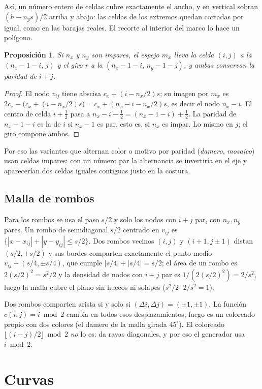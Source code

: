 \documentclass[11pt,a4paper]{article}
\theoremstyle{definition}
\theoremstyle{plain}
\newtheorem{proposicion}{Proposición}[section]
\theoremstyle{remark}
\begin{document}
Así, un número entero de celdas cubre exactamente el ancho, y en vertical sobran
$(h-n_ys)/2$ arriba y abajo: las celdas de los extremos quedan cortadas por igual,
como en las barajas reales. El recorte al interior del marco lo hace un polígono.

\begin{proposicion}\label{prop:paridad}
Si $n_x$ y $n_y$ son impares, el espejo $m_x$ lleva la celda $(i,j)$ a la
$(n_x-1-i,\,j)$ y el giro $r$ a la $(n_x-1-i,\,n_y-1-j)$, y ambas conservan la
paridad de $i+j$.
\end{proposicion}
\begin{proof}
El nodo $v_{ij}$ tiene abscisa $c_x+(i-n_x/2)s$; su imagen por $m_x$ es
$2c_x-\bigl(c_x+(i-n_x/2)s\bigr)=c_x+(n_x-i-n_x/2)s$, es decir el nodo $n_x-i$. El
centro de celda $i+\tfrac12$ pasa a $n_x-i-\tfrac12=(n_x-1-i)+\tfrac12$. La paridad
de $n_x-1-i$ es la de $i$ si $n_x-1$ es par, esto es, si $n_x$ es impar. Lo mismo
en $j$; el giro compone ambos.
\end{proof}

Por eso las variantes que alternan color o motivo por paridad (\emph{damero},
\emph{mosaico}) usan celdas impares: con un número par la alternancia se
invertiría en el eje y aparecerían dos celdas iguales contiguas justo en la
costura.

\subsection{Malla de rombos}
Para los rombos se usa el paso $s/2$ y solo los nodos con $i+j$ par, con
$n_x,n_y$ pares. Un rombo de semidiagonal $s/2$ centrado en $v_{ij}$ es
$\{|x-x_{ij}|+|y-y_{ij}|\le s/2\}$. Dos rombos vecinos $(i,j)$ y $(i+1,j\pm1)$
distan $(s/2,\pm s/2)$ y sus bordes comparten exactamente el punto medio
$v_{ij}+(s/4,\pm s/4)$, que cumple $|s/4|+|s/4|=s/2$; el área de un rombo es
$2(s/2)^2=s^2/2$ y la densidad de nodos con $i+j$ par es $1/(2(s/2)^2)=2/s^2$, luego
la malla cubre el plano sin huecos ni solapes ($s^2/2\cdot2/s^2=1$).

Dos rombos comparten arista si y solo si $(\Delta i,\Delta j)=(\pm1,\pm1)$. La
función $c(i,j)=i\bmod2$ cambia en todos esos desplazamientos, luego es un
coloreado propio con dos colores (el damero de la malla girada $45^\circ$). El
coloreado $\lfloor(i-j)/2\rfloor\bmod2$ \emph{no} lo es: da rayas diagonales, y
por eso el generador usa $i\bmod2$.

\section{Curvas}
\end{document}
